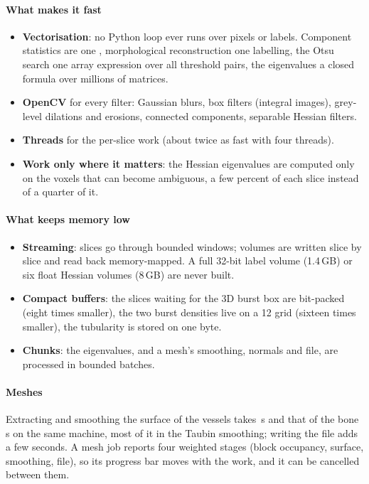 \paragraph{What makes it fast}
\begin{itemize}
  \item \textbf{Vectorisation}: no Python loop ever runs over pixels or labels. Component statistics are
        one , morphological reconstruction one labelling, the Otsu search one array
        expression over all threshold pairs, the eigenvalues a closed formula over millions of matrices.
  \item \textbf{OpenCV} for every filter: Gaussian blurs, box filters (integral images), grey-level
        dilations and erosions, connected components, separable Hessian filters.
  \item \textbf{Threads} for the per-slice work (about twice as fast with four threads).
  \item \textbf{Work only where it matters}: the Hessian eigenvalues are computed only on the voxels that
        can become ambiguous, a few percent of each slice instead of a quarter of it.
\end{itemize}

\paragraph{What keeps memory low}
\begin{itemize}
  \item \textbf{Streaming}: slices go through bounded windows; volumes are written slice by slice and
        read back memory-mapped. A full 32-bit label volume (1.4\,GB) or six float Hessian volumes
        (8\,GB) are never built.
  \item \textbf{Compact buffers}: the slices waiting for the 3D burst box are bit-packed (eight times
        smaller), the two burst densities live on a 12\um{} grid (sixteen times smaller), the tubularity is
        stored on one byte.
  \item \textbf{Chunks}: the eigenvalues, and a mesh's smoothing, normals and file, are processed in
        bounded batches.
\end{itemize}

\paragraph{Meshes} Extracting and smoothing the surface of the vessels takes
\pbValueMeshVesselSeconds\,s and that of the bone \pbValueMeshBoneSeconds\,s on the same machine, most
of it in the Taubin smoothing; writing the file adds a few seconds. A mesh job reports
four weighted stages (block occupancy, surface, smoothing, file), so its progress bar moves with the
work, and it can be cancelled between them.


